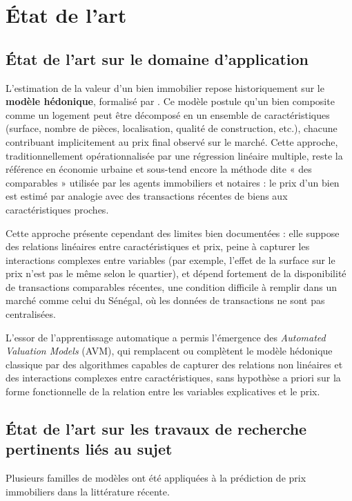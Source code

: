 \chapter{État de l'art}

\section{État de l'art sur le domaine d'application}

L'estimation de la valeur d'un bien immobilier repose historiquement sur le \textbf{modèle
hédonique}, formalisé par \citet{rosen1974hedonic}. Ce modèle postule qu'un bien composite
comme un logement peut être décomposé en un ensemble de caractéristiques (surface, nombre de
pièces, localisation, qualité de construction, etc.), chacune contribuant implicitement au prix
final observé sur le marché. Cette approche, traditionnellement opérationnalisée par une
régression linéaire multiple, reste la référence en économie urbaine et sous-tend encore la
méthode dite « des comparables » utilisée par les agents immobiliers et notaires : le prix d'un
bien est estimé par analogie avec des transactions récentes de biens aux caractéristiques
proches.

Cette approche présente cependant des limites bien documentées : elle suppose des relations
linéaires entre caractéristiques et prix, peine à capturer les interactions complexes entre
variables (par exemple, l'effet de la surface sur le prix n'est pas le même selon le quartier),
et dépend fortement de la disponibilité de transactions comparables récentes, une condition
difficile à remplir dans un marché comme celui du Sénégal, où les données de transactions ne
sont pas centralisées.

L'essor de l'apprentissage automatique a permis l'émergence des \emph{Automated Valuation
Models} (AVM), qui remplacent ou complètent le modèle hédonique classique par des algorithmes
capables de capturer des relations non linéaires et des interactions complexes entre
caractéristiques, sans hypothèse a priori sur la forme fonctionnelle de la relation entre les
variables explicatives et le prix.

\section{État de l'art sur les travaux de recherche pertinents liés au sujet}

Plusieurs familles de modèles ont été appliquées à la prédiction de prix immobiliers dans la
littérature récente.

